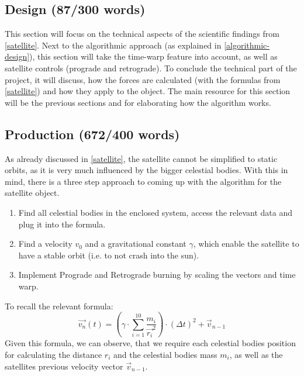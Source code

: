 \documentclass[conference,compsoc]{IEEEtran}
\begin{document}
\subsection{Design (87/300 words)}
This section will focus on the technical aspects of the scientific findings from \ref{satellite}. Next to the algorithmic approach (as explained in \ref{algorithmic-design}), this section will take the time-warp feature into account, as well as satellite controls (prograde and retrograde). To conclude the technical part of the project, it will discuss, how the forces are calculated (with the formulas from \ref{satellite}) and how they apply to the object. The main resource for this section will be the previous sections and \cite{UnityDoc} for elaborating how the algorithm works.
\subsection{Production (672/400 words)}
As already discussed in \ref{satellite}, the satellite cannot be simplified to static orbits, as it is very much influenced by the bigger celestial bodies. With this in mind, there is a three step approach to coming up with the algorithm for the satellite object.
\begin{enumerate}
	\item Find all celestial bodies in the enclosed system, access the relevant data and plug it into the formula.
	\item Find a velocity $v_{0}$ and a gravitational constant $\gamma$, which enable the satellite to have a stable orbit (i.e. to not crash into the sun).
	\item Implement Prograde and Retrograde burning by scaling the vectors and time warp.
\end{enumerate}
To recall the relevant formula: 
$$ \vec{v_{n}}(t) = (\gamma \cdot \sum_{i=1}^{10}{\frac{m_{i}}{\vec{r_{i}}^{2}}}) \cdot (\Delta t)^{2} + \vec{v}_{n-1} $$
Given this formula, we can observe, that we require each celestial bodies position for calculating the distance $r_{i}$ and the celestial bodies mass $m_{i}$, as well as the satellites previous velocity vector $\vec{v}_{n-1}$.
\end{document}
